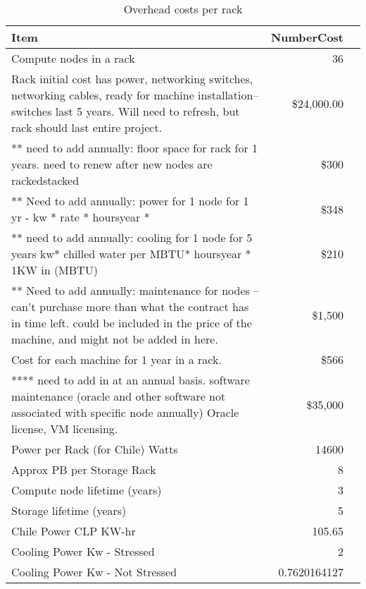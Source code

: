 \tiny \begin{longtable} { |p{}  |r  |r |} 
\caption{Overhead costs per rack \label{tab:overheads}}\\ 
\hline 
\textbf{Item}&\textbf{Number\/Cost} \\ \hline
{Compute nodes in a rack }&{36} \\ \hline
{Rack initial cost has power, networking switches, networking cables, ready for machine installation-- switches last 5 years.  Will need to refresh, but rack should last entire project.  }&{\$24,000.00} \\ \hline
{ ** need to add annually: floor space for rack for 1 years.   need to renew after new nodes are racked\/stacked }&{\$300} \\ \hline
{** Need to add annually: power for 1 node for 1 yr - kw * rate * hours\/year * }&{\$348} \\ \hline
{** need to add annually: cooling for 1 node for 5 years  kw* chilled water per MBTU* hours\/year *  1KW in (MBTU) }&{\$210} \\ \hline
{** Need to add annually: maintenance for nodes -- can't purchase more than what the contract has in time left.  could be included in the price of the machine, and might not be added in here.  }&{\$1,500} \\ \hline
{Cost for each machine for 1 year in a rack.   }&{\$566} \\ \hline
{**** need to add in at an annual basis.  software maintenance (oracle and other software not associated with specific node annually)  Oracle license, VM licensing.  }&{\$35,000} \\ \hline
{Power per Rack (for Chile) Watts}&{14600} \\ \hline
{Approx PB per Storage Rack }&{8} \\ \hline
{Compute node lifetime (years)}&{3} \\ \hline
{Storage lifetime (years)}&{5} \\ \hline
{Chile Power CLP \/ KW-hr
}&{105.65} \\ \hline
{Cooling Power Kw - Stressed}&{2} \\ \hline
{Cooling Power Kw - Not Stressed}&{0.7620164127} \\ \hline
\end{longtable} \normalsize
